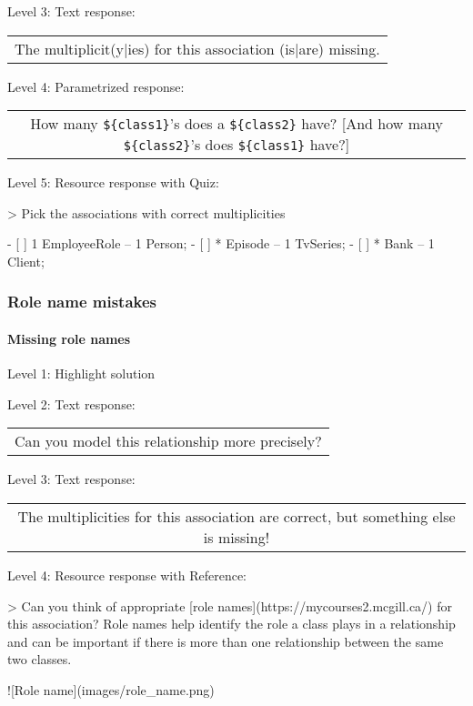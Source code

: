 \noindent Level 3: Text response: \medskip

\begin{tabular}{|c}
The multiplicit(y|ies) for this association (is|are) missing.
\end{tabular} \medskip

\noindent Level 4: Parametrized response: \medskip

\begin{tabular}{|c}
How many \verb|${class1}|'s does a \verb|${class2}| have? [And how many \verb|${class2}|'s does \verb|${class1}| have?]
\end{tabular} \medskip

\noindent Level 5: Resource response with Quiz:

> Pick the associations with correct multiplicities

- [ ] 1 EmployeeRole -- 1 Person;
- [ ] * Episode -- 1 TvSeries;
- [ ] * Bank -- 1 Client;


\subsubsection{Role name mistakes}

\paragraph{Missing role names}

\noindent Level 1: Highlight solution \medskip

\noindent Level 2: Text response: \medskip

\begin{tabular}{|c}
Can you model this relationship more precisely?
\end{tabular} \medskip

\noindent Level 3: Text response: \medskip

\begin{tabular}{|c}
The multiplicities for this association are correct, but something else is missing!
\end{tabular} \medskip

\noindent Level 4: Resource response with Reference:

> Can you think of appropriate [role names](https://mycourses2.mcgill.ca/)
for this association? Role names help identify the role a class plays in a
relationship and can be important if there is more than one relationship
between the same two classes.

![Role name](images/role_name.png)



